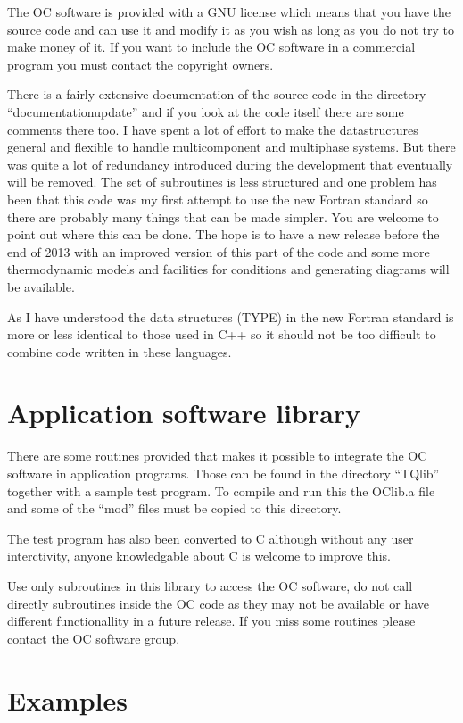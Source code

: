 \documentclass[12pt]{article}
\begin{document}
The OC software is provided with a GNU license which means that you
have the source code and can use it and modify it as you wish as long
as you do not try to make money of it.  If you want to include the OC
software in a commercial program you must contact the copyright
owners.

There is a fairly extensive documentation of the source code in the
directory ``documentationupdate'' and if you look at the code itself
there are some comments there too.  I have spent a lot of effort to
make the datastructures general and flexible to handle multicomponent
and multiphase systems.  But there was quite a lot of redundancy
introduced during the development that eventually will be removed.
The set of subroutines is less structured and one problem has been
that this code was my first attempt to use the new Fortran standard so
there are probably many things that can be made simpler.  You are
welcome to point out where this can be done.  The hope is to have a
new release before the end of 2013 with an improved version of this
part of the code and some more thermodynamic models and facilities for
conditions and generating diagrams will be available.

As I have understood the data structures (TYPE) in the new Fortran
standard is more or less identical to those used in C++ so it should
not be too difficult to combine code written in these languages.

\section{Application software library}

There are some routines provided that makes it possible to integrate
the OC software in application programs.  Those can be found in the
directory ``TQlib'' together with a sample test program.  To compile
and run this the OClib.a file and some of the ``mod'' files must be
copied to this directory.

The test program has also been converted to C although without any
user interctivity, anyone knowledgable about C is welcome to improve
this.

Use only subroutines in this library to access the OC software, do not
call directly subroutines inside the OC code as they may not be
available or have different functionallity in a future release.  If
you miss some routines please contact the OC software group.

\section{Examples}
\end{document}
